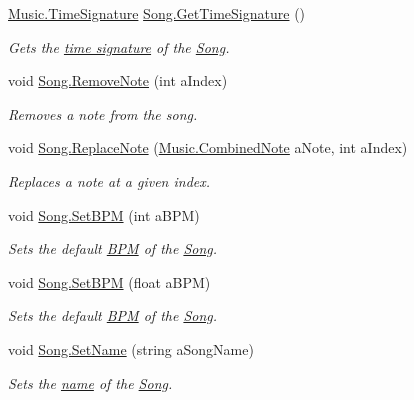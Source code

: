\begin{DoxyCompactItemize}
\hyperlink{group___music_structs_struct_music_1_1_time_signature}{Music.\+Time\+Signature} \hyperlink{group___song_pub_func_ga26315bb6d554d46e2eba2ac03ee70cc1}{Song.\+Get\+Time\+Signature} ()
\begin{DoxyCompactList}\small\item\em Gets the \hyperlink{group___music_structs_struct_music_1_1_time_signature}{time signature} of the \hyperlink{class_song}{Song}. \end{DoxyCompactList}\item 
void \hyperlink{group___song_pub_func_ga856634e047b8c35160958c3aa53d6b28}{Song.\+Remove\+Note} (int a\+Index)
\begin{DoxyCompactList}\small\item\em Removes a note from the song. \end{DoxyCompactList}\item 
void \hyperlink{group___song_pub_func_ga326d61c75339080057a02c6decb0cde3}{Song.\+Replace\+Note} (\hyperlink{group___music_structs_struct_music_1_1_combined_note}{Music.\+Combined\+Note} a\+Note, int a\+Index)
\begin{DoxyCompactList}\small\item\em Replaces a note at a given index. \end{DoxyCompactList}\item 
void \hyperlink{group___song_pub_func_gaa65bbba1af7192edff7e0f848029013b}{Song.\+Set\+B\+PM} (int a\+B\+PM)
\begin{DoxyCompactList}\small\item\em Sets the default \hyperlink{group___audio_DefBPM}{B\+PM} of the \hyperlink{class_song}{Song}. \end{DoxyCompactList}\item 
void \hyperlink{group___song_pub_func_ga1efefe19fd0c5962f7f8ed16c65cd835}{Song.\+Set\+B\+PM} (float a\+B\+PM)
\begin{DoxyCompactList}\small\item\em Sets the default \hyperlink{group___audio_DefBPM}{B\+PM} of the \hyperlink{class_song}{Song}. \end{DoxyCompactList}\item 
void \hyperlink{group___song_pub_func_gacb01510cf72657fc7c64bb6ba00c2c56}{Song.\+Set\+Name} (string a\+Song\+Name)
\begin{DoxyCompactList}\small\item\em Sets the \hyperlink{group___song_priv_var_ga6a5e6c1e4aa92939e2b5c1e3d9908df8}{name} of the \hyperlink{class_song}{Song}. \end{DoxyCompactList}\item 

\end{DoxyCompactItemize}
